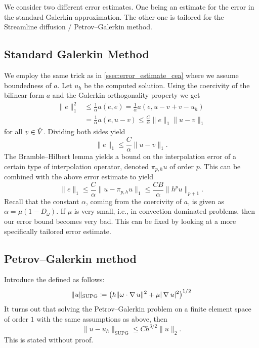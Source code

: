 We consider two different error estimates. One being an estimate for the error
in the standard Galerkin approximation. The other one is tailored for the
Streamline diffusion / Petrov--Galerkin method.

\subsection{Standard Galerkin Method}

We employ the same trick as in \vref{ssec:error_estimate_cea} where we assume
boundedness of \(a\). Let \( u_h \) be the computed solution. Using the
coercivity of the bilinear form \( a \) and the Galerkin orthogonality property
we get
\begin{align}
    \|e\|_1^2 &\leq \frac{1}{\alpha} a(e, e) = \frac{1}{\alpha} a(e, u - v + v - u_h)\\
              &= \frac{1}{\alpha}a(e, u - v) \leq \frac{C}{\alpha}\| e\|_1 \| u - v \|_1
\end{align}
for all \( v \in \hat{V} \).
Dividing both sides yield
\begin{equation}
    \| e \|_1 \leq \frac{C}{\alpha}\| u - v \|_1.
\end{equation}
The Bramble--Hilbert lemma yields a bound on the interpolation error of a
certain type of interpolation operator, denoted \( \pi_{p, h} u \) of order \(
p \). This can be combined with the above error estimate to yield
\begin{equation}
    \| e \|_1 \leq \frac{C}{\alpha}\| u - \pi_{p, h} u \|_1 \leq \frac{CB}{\alpha} \| h^p u \|_{p+1}.
\end{equation}
Recall that the constant \( \alpha \), coming from the coercivity of \(a \), is
given as \( \alpha = \mu ( 1 - D_\omega) \). If \( \mu \) is very small, i.e.,
in convection dominated problems,  then our error bound becomes very bad. This
can be fixed by looking at a more specifically tailored error estimate.

\subsection{Petrov--Galerkin method}

Introduce the  defined as follows:
\begin{equation}
    \| u \|_{\mathrm{SUPG}} \coloneqq \left(h \| \omega \cdot \operatorname{\mathop{}\!\nabla} u \|^2 + \mu | \operatorname{\mathop{}\!\nabla} u |^2 \right)^{1 / 2}
\end{equation}
It turns out that solving the Petrov--Galerkin problem on a finite element
space of order \( 1 \) with the same assumptions as above, then
\begin{equation}
    \| u - u_h\|_{\mathrm{SUPG}} \leq Ch^{3/2} \|u\|_2.
\end{equation}
This is stated without proof.
